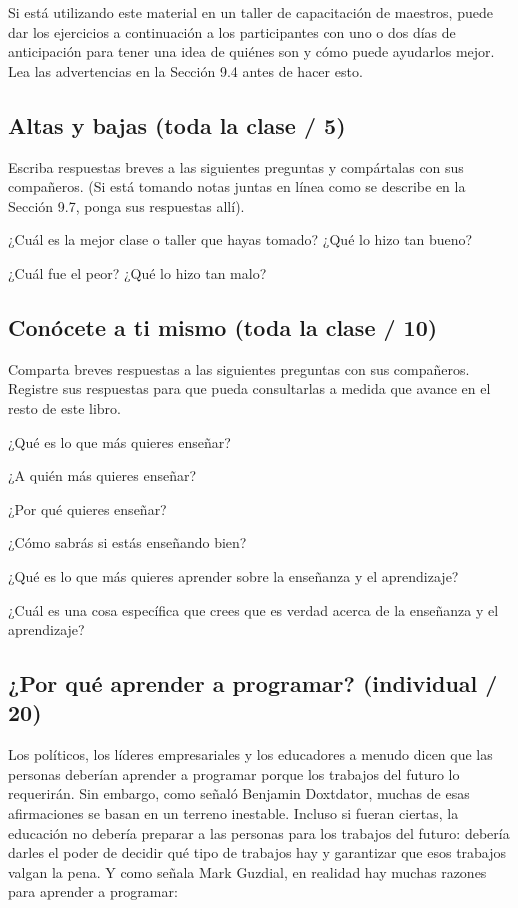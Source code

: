 \documentclass[
]{book}
\begin{document}
Si está utilizando este material en un taller de capacitación de maestros, puede dar los ejercicios a continuación a los participantes con uno o dos días de anticipación para tener una idea de quiénes son y cómo puede ayudarlos mejor. Lea las advertencias en la Sección 9.4 antes de hacer esto.

\hypertarget{altas-y-bajas-toda-la-clase-5}{%
\subsection{Altas y bajas (toda la clase / 5)}\label{altas-y-bajas-toda-la-clase-5}}

Escriba respuestas breves a las siguientes preguntas y compártalas con sus compañeros. (Si está tomando notas juntas en línea como se describe en la Sección 9.7, ponga sus respuestas allí).

¿Cuál es la mejor clase o taller que hayas tomado? ¿Qué lo hizo tan bueno?

¿Cuál fue el peor? ¿Qué lo hizo tan malo?

\hypertarget{conuxf3cete-a-ti-mismo-toda-la-clase-10}{%
\subsection{Conócete a ti mismo (toda la clase / 10)}\label{conuxf3cete-a-ti-mismo-toda-la-clase-10}}

Comparta breves respuestas a las siguientes preguntas con sus compañeros. Registre sus respuestas para que pueda consultarlas a medida que avance en el resto de este libro.

¿Qué es lo que más quieres enseñar?

¿A quién más quieres enseñar?

¿Por qué quieres enseñar?

¿Cómo sabrás si estás enseñando bien?

¿Qué es lo que más quieres aprender sobre la enseñanza y el aprendizaje?

¿Cuál es una cosa específica que crees que es verdad acerca de la enseñanza y el aprendizaje?

\hypertarget{por-quuxe9-aprender-a-programar-individual-20}{%
\subsection{¿Por qué aprender a programar? (individual / 20)}\label{por-quuxe9-aprender-a-programar-individual-20}}

Los políticos, los líderes empresariales y los educadores a menudo dicen que las personas deberían aprender a programar porque los trabajos del futuro lo requerirán. Sin embargo, como señaló Benjamin Doxtdator, muchas de esas afirmaciones se basan en un terreno inestable. Incluso si fueran ciertas, la educación no debería preparar a las personas para los trabajos del futuro: debería darles el poder de decidir qué tipo de trabajos hay y garantizar que esos trabajos valgan la pena. Y como señala Mark Guzdial, en realidad hay muchas razones para aprender a programar:
\end{document}
